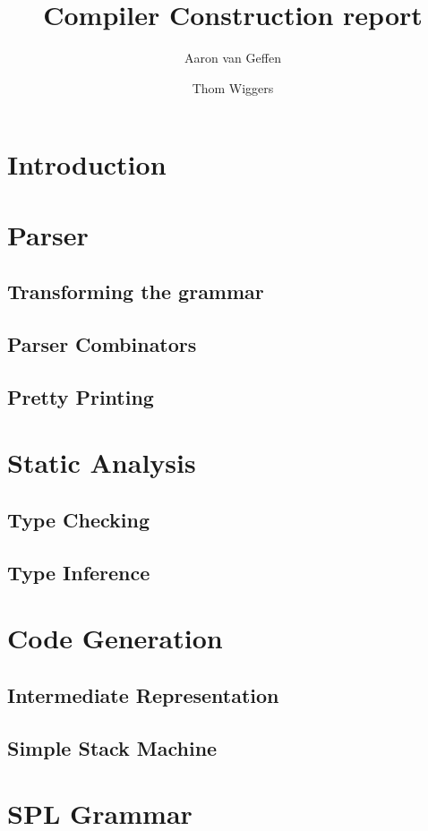 \documentclass[a4paper,draft]{report}
\author{Aaron van Geffen \and Thom Wiggers}
\title{Compiler Construction report}
\begin{document}
\maketitle

\chapter*{Introduction}

\chapter{Parser}

\section{Transforming the grammar}

\section{Parser Combinators}

\section{Pretty Printing}

\chapter{Static Analysis}

\section{Type Checking}

\section{Type Inference}

\chapter{Code Generation}

\section{Intermediate Representation}

\section{Simple Stack Machine}


\appendix
\chapter{SPL Grammar}
\end{document}
